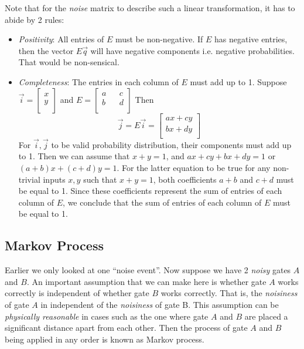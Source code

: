\documentclass{article}
\begin{document}
Note that for the \textit{noise} matrix to describe such a linear transformation, it has
to abide by 2 rules:
\begin{itemize}
  \item \textit{Positivity}: All entries of \(E\) must be non-negative. If \(E\) has
  negative entries, then the vector \(E\vec{q}\) will have negative components i.e.
  negative probabilities. That would be non-sensical.
  \item \textit{Completeness}: The entries in each column of \(E\) must add up to 1.
  Suppose
  \(\vec{i} = \begin{bmatrix}
    x \\
    y \\
  \end{bmatrix}\) and \(
  E = \begin{bmatrix}
    a && c \\
    b && d \\
  \end{bmatrix}\)
  Then
  \[\vec{j} = E\vec{i} = \begin{bmatrix}
    ax + cy \\
    bx + dy \\
  \end{bmatrix}\]
  For \(\vec{i}, \vec{j}\) to be valid probability distribution, their components
  must add up to 1. Then we can assume that \(x+y = 1\), and
  \(ax + cy + bx + dy = 1\) or \((a+b)x + (c+d)y = 1\). For the latter equation
  to be true for any non-trivial inputs \(x, y\) such that \(x+y = 1\),
  both coefficients \(a+b\) and \(c+d\) must be equal to 1. Since these coefficients
  represent the sum of entries of each column of \(E\), we conclude that
  the sum of entries of each column of \(E\) must be equal to 1.
\end{itemize}
\subsection{Markov Process}

Earlier we only looked at one ``noise event''.
Now suppose we have 2 \textit{noisy} gates \(A\) and \(B\). An important
assumption that we can make here is whether gate \(A\) works correctly is
independent of whether gate \(B\) works correctly. That is, the \textit{noisiness}
of gate \(A\) in independent of the \textit{noisiness} of gate B. This assumption
can be \textit{physically reasonable} in cases such as the one where gate \(A\)
and \(B\) are placed a significant distance apart from each other. Then the
process of gate \(A\) and \(B\) being applied in any order is known as Markov
process.
\end{document}
